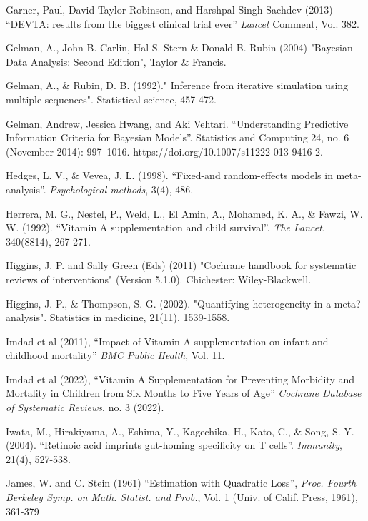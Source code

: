 \documentclass[12pt]{article}
\begin{document}
\begin{thebibliography}{99}
 Garner, Paul, David Taylor-Robinson, and Harshpal Singh Sachdev (2013) ``DEVTA: results from the biggest clinical trial ever'' \emph{Lancet} Comment, Vol. 382.

 Gelman, A., John B. Carlin, Hal S. Stern \& Donald B. Rubin (2004) "Bayesian Data Analysis: Second Edition", Taylor \& Francis.

 Gelman, A., \& Rubin, D. B. (1992)." Inference from iterative simulation using multiple sequences". Statistical science, 457-472.

 Gelman, Andrew, Jessica Hwang, and Aki Vehtari. ``Understanding Predictive Information Criteria for Bayesian Models''. Statistics and Computing 24, no. 6 (November 2014): 997–1016. https://doi.org/10.1007/s11222-013-9416-2.

 Hedges, L. V., \& Vevea, J. L. (1998). ``Fixed-and random-effects models in meta-analysis''. \emph{Psychological methods}, 3(4), 486.

 Herrera, M. G., Nestel, P., Weld, L., El Amin, A., Mohamed, K. A., \& Fawzi, W. W. (1992). ``Vitamin A supplementation and child survival''. \emph{The Lancet}, 340(8814), 267-271.

 Higgins, J. P. and Sally Green (Eds) (2011) "Cochrane handbook for systematic reviews of interventions" (Version 5.1.0). Chichester: Wiley-Blackwell.

 Higgins, J. P., \& Thompson, S. G. (2002). "Quantifying heterogeneity in a meta?analysis". Statistics in medicine, 21(11), 1539-1558.

 Imdad et al (2011), ``Impact of Vitamin A supplementation on infant and childhood mortality'' \emph{BMC Public Health}, Vol. 11.

 Imdad et al (2022), ``Vitamin A Supplementation for Preventing Morbidity and Mortality in Children from Six Months to Five Years of Age'' \emph{Cochrane Database of Systematic Reviews}, no. 3 (2022).

 Iwata, M., Hirakiyama, A., Eshima, Y., Kagechika, H., Kato, C., \& Song, S. Y. (2004). ``Retinoic acid imprints gut-homing specificity on T cells''. \emph{Immunity}, 21(4), 527-538.

 James, W. and C. Stein (1961) ``Estimation with Quadratic Loss'', \emph{Proc. Fourth Berkeley Symp. on Math. Statist. and Prob.}, Vol. 1 (Univ. of Calif. Press, 1961), 361-379


\end{thebibliography}
\end{document}
